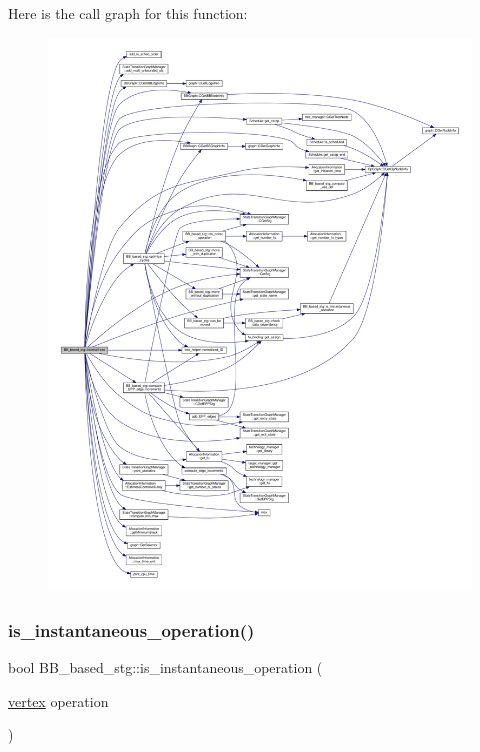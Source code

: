 Here is the call graph for this function\+:
\nopagebreak
\begin{figure}[H]
\begin{center}
\leavevmode
\includegraphics[width=350pt]{dd/d84/classBB__based__stg_ada4c8f3601fd2e5dee0ccffe8bfdd430_cgraph}
\end{center}
\end{figure}
\mbox{\label{classBB__based__stg_af428643fbc02e8269040fc2ecdb73986}} 
\subsubsection{\texorpdfstring{is\+\_\+instantaneous\+\_\+operation()}{is\_instantaneous\_operation()}}
{\footnotesize\ttfamily bool B\+B\+\_\+based\+\_\+stg\+::is\+\_\+instantaneous\+\_\+operation (\begin{DoxyParamCaption}\item[{\hyperlink{graph_8hpp_abefdcf0544e601805af44eca032cca14}{vertex}}]{operation }\end{DoxyParamCaption})\hspace{0.3cm}{\ttfamily [private]}}




